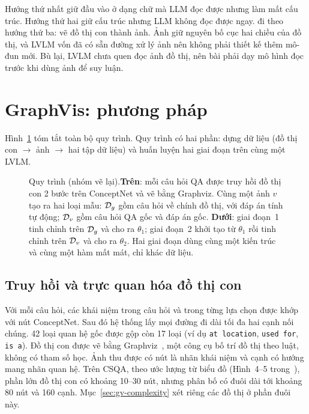 Hướng thứ nhất giữ đầu vào ở dạng chữ mà LLM đọc được nhưng làm mất cấu trúc. Hướng thứ hai giữ cấu trúc nhưng LLM không đọc được ngay. \GV{} đi theo hướng thứ ba: vẽ đồ thị con thành ảnh. Ảnh giữ nguyên bố cục hai chiều của đồ thị, và LVLM vốn đã có sẵn đường xử lý ảnh nên không phải thiết kế thêm mô-đun mới. Bù lại, LVLM chưa quen đọc ảnh đồ thị, nên bài phải dạy mô hình đọc trước khi dùng ảnh để suy luận.

\section{GraphVis: phương pháp}\label{sec:gv-method}
Hình~\ref{fig:gv-pipeline} tóm tắt toàn bộ quy trình. Quy trình có hai phần: dựng dữ liệu (đồ thị con $\rightarrow$ ảnh $\rightarrow$ hai tập dữ liệu) và huấn luyện hai giai đoạn trên cùng một LVLM.

\begin{figure}[t]
\centering

\caption{Quy trình \GV{} (nhóm vẽ lại).\textbf{Trên}: mỗi câu hỏi QA được truy hồi đồ thị con 2 bước trên ConceptNet và vẽ bằng Graphviz. Cùng một ảnh $v$ tạo ra hai loại mẫu: $\mathcal{D}_g$ gồm câu hỏi về chính đồ thị, với đáp án tính tự động; $\mathcal{D}_v$ gồm câu hỏi QA gốc và đáp án gốc. \textbf{Dưới}: giai đoạn~1 tinh chỉnh trên $\mathcal{D}_g$ và cho ra $\theta_1$; giai đoạn~2 khởi tạo từ $\theta_1$ rồi tinh chỉnh trên $\mathcal{D}_v$ và cho ra $\theta_2$. Hai giai đoạn dùng cùng một kiến trúc và cùng một hàm mất mát, chỉ khác dữ liệu.}
\label{fig:gv-pipeline}
\end{figure}

\subsection{Truy hồi và trực quan hóa đồ thị con}
Với mỗi câu hỏi, các khái niệm trong câu hỏi và trong từng lựa chọn được khớp với nút ConceptNet. Sau đó hệ thống lấy mọi đường đi dài tối đa hai cạnh nối chúng. 42 loại quan hệ gốc được gộp còn 17 loại (ví dụ \texttt{at location}, \texttt{used for}, \texttt{is a}). Đồ thị con được vẽ bằng Graphviz~\cite{gansner2000graphviz}, một công cụ bố trí đồ thị theo luật, không có tham số học. Ảnh thu được có nút là nhãn khái niệm và cạnh có hướng mang nhãn quan hệ. Trên CSQA, theo ước lượng từ biểu đồ (Hình~4--5 trong~\cite{deng2024graphvis}), phần lớn đồ thị con có khoảng 10--30 nút, nhưng phân bố có đuôi dài tới khoảng 80 nút và 160 cạnh. Mục~\ref{sec:gv-complexity} xét riêng các đồ thị ở phần đuôi này.

